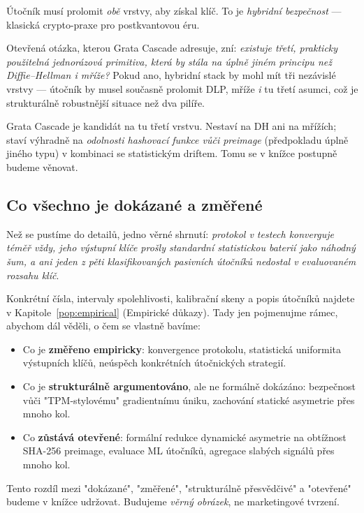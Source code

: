 \documentclass[11pt,a4paper]{article}
\begin{document}
Útočník musí prolomit \emph{obě} vrstvy, aby získal klíč. To je \emph{hybridní bezpečnost} --- klasická crypto-praxe pro postkvantovou éru.

Otevřená otázka, kterou Grata Cascade adresuje, zní: \emph{existuje třetí, prakticky použitelná jednorázová primitiva, která by stála na úplně jiném principu než Diffie--Hellman i mříže?} Pokud ano, hybridní stack by mohl mít tři nezávislé vrstvy --- útočník by musel současně prolomit DLP, mříže \emph{i} tu třetí asumci, což je strukturálně robustnější situace než dva pilíře.

Grata Cascade je kandidát na tu třetí vrstvu. Nestaví na DH ani na mřížích; staví výhradně na \emph{odolnosti hashovací funkce vůči preimage} (předpokladu úplně jiného typu) v kombinaci se statistickým driftem. Tomu se v knížce postupně budeme věnovat.

\subsection{Co všechno je dokázané a změřené}

Než se pustíme do detailů, jedno věrné shrnutí: \emph{protokol v testech konverguje téměř vždy, jeho výstupní klíče prošly standardní statistickou baterií jako náhodný šum, a ani jeden z pěti klasifikovaných pasivních útočníků nedostal v evaluovaném rozsahu klíč}.

Konkrétní čísla, intervaly spolehlivosti, kalibrační skeny a popis útočníků najdete v Kapitole~\ref{pop:empirical} (Empirické důkazy). Tady jen pojmenujme rámec, abychom dál věděli, o čem se vlastně bavíme:

\begin{itemize}[leftmargin=*]
\item Co je \textbf{změřeno empiricky}: konvergence protokolu, statistická uniformita výstupních klíčů, neúspěch konkrétních útočnických strategií.
\item Co je \textbf{strukturálně argumentováno}, ale ne formálně dokázáno: bezpečnost vůči "TPM-stylovému" gradientnímu úniku, zachování statické asymetrie přes mnoho kol.
\item Co \textbf{zůstává otevřené}: formální redukce dynamické asymetrie na obtížnost SHA-256 preimage, evaluace ML útočníků, agregace slabých signálů přes mnoho kol.
\end{itemize}

Tento rozdíl mezi "dokázané", "změřené", "strukturálně přesvědčivé" a "otevřené" budeme v knížce udržovat. Budujeme \emph{věrný obrázek}, ne marketingové tvrzení.
\end{document}

